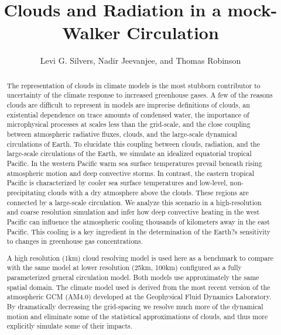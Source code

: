 \documentclass[11pt]{article}   	%
\title{Clouds and Radiation in a mock-Walker Circulation}
\author{Levi G. Silvers, Nadir Jeevanjee, and Thomas Robinson}
\begin{document}
\maketitle

\begin{abstract}

The representation of clouds in climate models is the most stubborn contributor to uncertainty of the climate response to increased 
greenhouse gases.  A few of the reasons clouds are difficult to represent in models are imprecise definitions of clouds, an existential 
dependence on trace amounts of condensed water, the importance of microphysical processes at scales less than the grid-scale, 
and the close coupling between atmospheric radiative fluxes, clouds, and the large-scale dynamical circulations of Earth.  To elucidate this coupling between clouds, radiation, and the large-scale circulations of the Earth, we simulate an idealized equatorial tropical Pacific.   In the western Pacific warm sea surface temperatures prevail beneath rising atmospheric motion and deep convective storms.   In contrast, the eastern tropical Pacific is characterized by cooler sea surface temperatures and low-level, non-precipitating clouds with a dry atmosphere above the clouds.  These regions are connected by a large-scale circulation.  We analyze this scenario in a high-resolution and coarse resolution simulation and infer how deep convective heating in the west Pacific can influence the atmospheric cooling thousands of kilometers away in the east Pacific.  This cooling is a key ingredient in the determination of the Earth?s sensitivity to changes in greenhouse gas concentrations.

A high resolution (1km) cloud resolving model is used here as a benchmark to compare with the same model at lower 
resolution (25km, 100km) configured 
as a fully parameterized general circulation model.  Both models use approximately the same spatial domain.  The climate model used is derived from the most recent version of the atmospheric GCM (AM4.0) developed at the Geophysical Fluid Dynamics Laboratory.  By dramatically decreasing the grid-spacing we resolve much more of the dynamical motion and eliminate some of the statistical approximations of clouds, and thus more explicitly simulate some of their impacts.  

\end{abstract}

\end{document}

